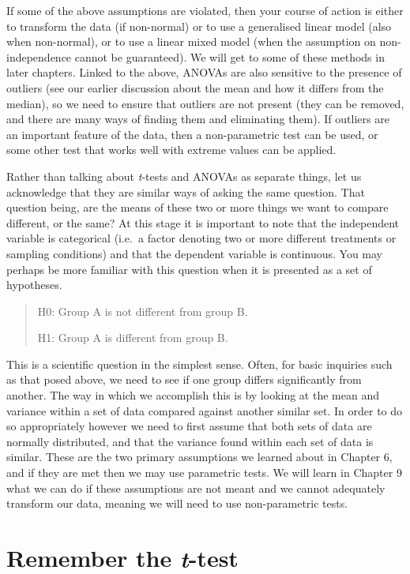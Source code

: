 \documentclass[english,10pt,a4paper,oneside]{book}
\theoremstyle{definition}
\theoremstyle{definition}
\theoremstyle{definition}
\theoremstyle{remark}
\begin{document}
If some of the above assumptions are violated, then your course of
action is either to transform the data (if non-normal) or to use a
generalised linear model (also when non-normal), or to use a linear
mixed model (when the assumption on non-independence cannot be
guaranteed). We will get to some of these methods in later chapters.
Linked to the above, ANOVAs are also sensitive to the presence of
outliers (see our earlier discussion about the mean and how it differs
from the median), so we need to ensure that outliers are not present
(they can be removed, and there are many ways of finding them and
eliminating them). If outliers are an important feature of the data,
then a non-parametric test can be used, or some other test that works
well with extreme values can be applied.

Rather than talking about \emph{t}-tests and ANOVAs as separate things,
let us acknowledge that they are similar ways of asking the same
question. That question being, are the means of these two or more things
we want to compare different, or the same? At this stage it is important
to note that the independent variable is categorical (i.e.~a factor
denoting two or more different treatments or sampling conditions) and
that the dependent variable is continuous. You may perhaps be more
familiar with this question when it is presented as a set of hypotheses.

\begin{quote}
H0: Group A is not different from group B.

H1: Group A is different from group B.
\end{quote}

This is a scientific question in the simplest sense. Often, for basic
inquiries such as that posed above, we need to see if one group differs
significantly from another. The way in which we accomplish this is by
looking at the mean and variance within a set of data compared against
another similar set. In order to do so appropriately however we need to
first assume that both sets of data are normally distributed, and that
the variance found within each set of data is similar. These are the two
primary assumptions we learned about in Chapter 6, and if they are met
then we may use parametric tests. We will learn in Chapter 9 what we can
do if these assumptions are not meant and we cannot adequately transform
our data, meaning we will need to use non-parametric tests.

\section{\texorpdfstring{Remember the
\emph{t}-test}{Remember the t-test}}\label{remember-the-t-test}
\end{document}
